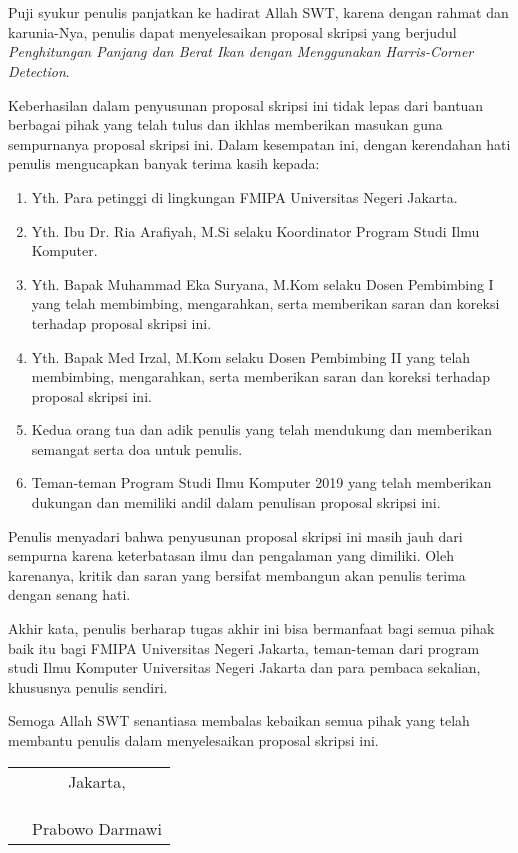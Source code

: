\chapter*{}

Puji syukur penulis panjatkan ke hadirat Allah SWT, karena dengan rahmat dan
karunia-Nya, penulis dapat menyelesaikan proposal skripsi yang berjudul
\textit{Penghitungan Panjang dan Berat Ikan dengan Menggunakan Harris-Corner Detection}.

Keberhasilan dalam penyusunan proposal skripsi ini tidak lepas dari bantuan
berbagai pihak yang telah tulus dan ikhlas memberikan masukan guna sempurnanya proposal skripsi ini. Dalam kesempatan ini, dengan
kerendahan hati penulis mengucapkan banyak terima kasih kepada:

\begin{enumerate}

	\item{Yth. Para petinggi di lingkungan FMIPA Universitas Negeri Jakarta.}
	\item{Yth. Ibu Dr. Ria Arafiyah, M.Si selaku Koordinator Program Studi Ilmu
		Komputer.}
	\item{Yth. Bapak Muhammad Eka Suryana, M.Kom selaku Dosen Pembimbing I yang
		telah membimbing, mengarahkan, serta memberikan saran dan koreksi terhadap
		proposal skripsi ini.}
	\item{Yth. Bapak Med Irzal, M.Kom selaku Dosen Pembimbing II yang telah
		membimbing, mengarahkan, serta memberikan saran dan koreksi terhadap
		proposal skripsi ini.}
	\item{Kedua orang tua dan adik penulis yang telah mendukung dan memberikan 
		semangat serta doa untuk penulis.}
	\item{Teman-teman Program Studi Ilmu Komputer 2019 yang telah memberikan 
		dukungan dan memiliki andil dalam penulisan proposal skripsi ini.}
	
\end{enumerate}

Penulis menyadari bahwa penyusunan proposal skripsi ini masih jauh dari sempurna
karena keterbatasan ilmu dan pengalaman yang dimiliki. Oleh karenanya, kritik
dan saran yang bersifat membangun akan penulis terima dengan senang hati. 

Akhir kata, penulis berharap tugas akhir ini bisa bermanfaat bagi semua pihak baik itu bagi FMIPA Universitas Negeri Jakarta, teman-teman dari program studi Ilmu
Komputer Universitas Negeri Jakarta dan para pembaca sekalian, khususnya penulis sendiri.

Semoga Allah SWT senantiasa membalas kebaikan semua pihak yang telah membantu penulis dalam menyelesaikan proposal skripsi ini.

\vspace{4cm}

\begin{tabular}{p{7.5cm}c}
	&Jakarta, \\
	&\\
	&\\
	&\\
	&Prabowo Darmawi
\end{tabular}
